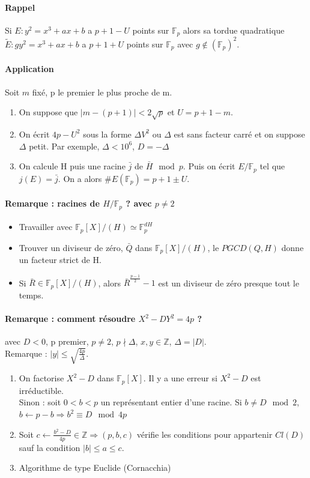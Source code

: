 \documentclass[12pt,a4paper]{report}
\begin{document}
\paragraph{Rappel\\}
Si $ E : y^2 = x^3 + ax +b $ a $p+1-U$ points sur $\mathbb{F}_p$ alors sa tordue quadratique $ \tilde{E} : gy^2= x^3 +ax +b $ a $p+1+U$ points sur $\mathbb{F}_p$ avec $ g \not \in (\mathbb{F}_p)^2$.
\paragraph{Application\\}
Soit $m$ fixé, p le premier le plus proche de m.
\begin{enumerate}
\item On suppose que $ |m-(p+1)| < 2\sqrt{p}$ et $ U = p+1 - m $.
\item On écrit $4p-U^2$ sous la forme $\Delta V^2$ ou $\Delta$ est sans facteur carré et on suppose $ \Delta$ petit. Par exemple, $ \Delta < 10^6 $, $D= - \Delta$
\item On calcule H puis une racine $\bar{j}$ de $\bar{H} \mod p $. Puis on écrit $E/\mathbb{F}_p $ tel que $ j(E) = \bar{j} $. On a alors $\# E(\mathbb{F}_p)=p+1\pm U$.
\end{enumerate}
\paragraph{Remarque : racines de $H/\mathbb{F}_p$ ? avec $p\neq 2$\\}
\begin{itemize}
\item Travailler avec $ \mathbb{F}_p[X] / (H) \simeq \mathbb{F}_p^{dH} $
\item Trouver un diviseur de zéro, $\bar{Q} $ dans $\mathbb{F}_p[X] / (H) $, le $ PGCD(Q,H)$ donne un facteur strict de H.
\item Si $\bar{R} \in \mathbb{F}_p[X] / (H) $, alors $\bar{R}^{\frac{p-1}{2}}-1$ est un diviseur de zéro presque tout le temps.
\end{itemize}
\paragraph{Remarque : comment résoudre $X^2 - DY^2 = 4p$ ?\\}
avec $D<0$, p premier, $p\neq 2$, $p \nmid \Delta$, $x,y \in \mathbb{Z}$, $\Delta = |D|$.\\
Remarque : $ |y| \leqslant \sqrt{\frac{4p}{\Delta}}$.
\begin{enumerate}
\item On factorise $X^2 - D$ dans $\mathbb{F}_p[X]$. Il y a une erreur si $ X^2 - D$ est irréductible.\\
Sinon : soit $0<b<p$ un représentant entier d'une racine. Si $b\neq D \mod 2$, $b\leftarrow p-b \Rightarrow b^2 \equiv D \mod 4p$
\item Soit $c \leftarrow \frac{b^2-D}{4p} \in \mathbb{Z} \Longrightarrow (p,b,c)$ vérifie les conditions pour appartenir  $Cl(D)$ sauf la condition $|b| \leqslant a \leqslant c$.
\item Algorithme de type Euclide (Cornacchia)
\end{enumerate}
\end{document}
